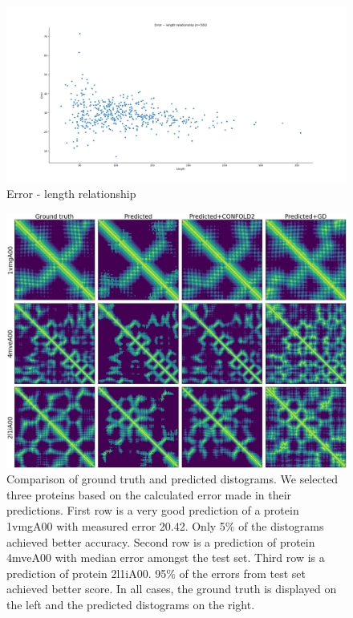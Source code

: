 \begin{figure}
    \centering
    \includegraphics[width=\linewidth]{imgs_andy/error_length_test_set_ensemble_simetrized.png}
    \caption{Error - length relationship}
    \label{fig:err_len}
\end{figure}

\begin{figure}
    \centering
    \includegraphics[width=\linewidth]{imgs_andy/distograms/distance_maps_test_structures.png}
    \caption{Comparison of ground truth and predicted distograms. We selected three proteins based on the calculated error made in their predictions. First row is a very good prediction of a protein 1vmgA00 with measured error 20.42. Only 5\% of the distograms achieved better accuracy. Second row is a prediction of protein 4mveA00 with median error amongst the test set. Third row is a prediction of protein 2l1iA00. 95\% of the errors from test set achieved better score. In all cases, the ground truth is displayed on the left and the predicted distograms on the right.}
    \label{fig:distograms}
\end{figure}

